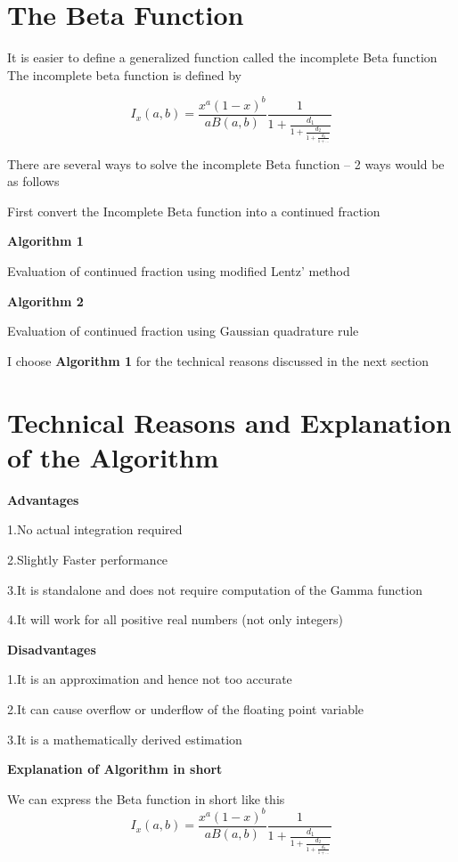 \documentclass[12pt,letterpaper]{article}
\begin{document}
\section*{The Beta Function}

It is easier to define a generalized function called the incomplete Beta function 
The incomplete beta function is defined by

$$I_x(a,b)=\frac{x^a(1-x)^b}{aB(a,b)}\frac{1}{1+\frac{d_1}{1+\frac{d_2}{1+\frac{d_3}{1+...}}}}$$

There are several ways to solve the incomplete Beta function – 2 ways would be as follows

First convert the Incomplete Beta function into a continued fraction

\textbf{Algorithm 1}

Evaluation of continued fraction using modified Lentz’  method

\textbf{Algorithm 2}

Evaluation of continued fraction using Gaussian quadrature rule

I choose \textbf{Algorithm 1} for the technical reasons discussed in the next section



\section*{Technical Reasons and Explanation of the Algorithm}

\textbf{Advantages}

1.No actual integration required

2.Slightly Faster performance

3.It is standalone and does not require computation of the Gamma function

4.It will work for all positive real numbers (not only integers)

\textbf{Disadvantages}

1.It is an approximation and hence not too accurate

2.It can cause overflow or underflow of the floating point variable

3.It is a mathematically derived estimation \newline


\textbf{Explanation of Algorithm in short}


We can express the Beta function in short like this
$$I_x(a,b)=\frac{x^a(1-x)^b}{aB(a,b)}\frac{1}{1+\frac{d_1}{1+\frac{d_2}{1+\frac{d_3}{1+...}}}}$$
\end{document}
